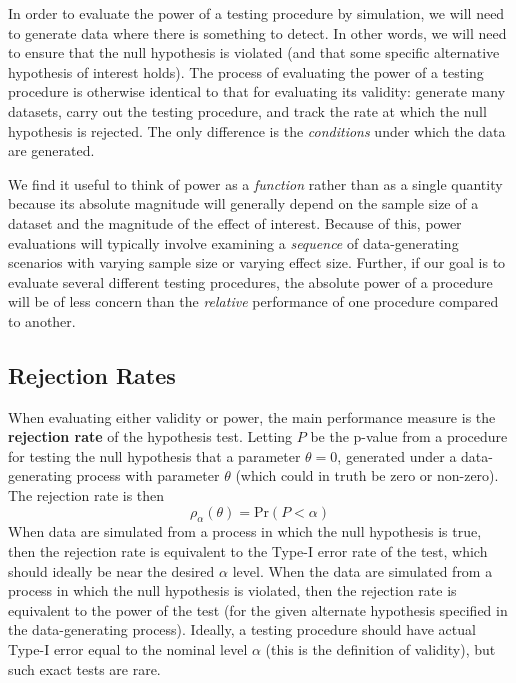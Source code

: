 \documentclass[
]{book}
\newcommand{\Prob}{\text{Pr}}
\begin{document}
In order to evaluate the power of a testing procedure by simulation, we will need to generate data where there is something to detect.
In other words, we will need to ensure that the null hypothesis is violated (and that some specific alternative hypothesis of interest holds).
The process of evaluating the power of a testing procedure is otherwise identical to that for evaluating its validity: generate many datasets, carry out the testing procedure, and track the rate at which the null hypothesis is rejected.
The only difference is the \emph{conditions} under which the data are generated.

We find it useful to think of power as a \emph{function} rather than as a single quantity because its absolute magnitude will generally depend on the sample size of a dataset and the magnitude of the effect of interest.
Because of this, power evaluations will typically involve examining a \emph{sequence} of data-generating scenarios with varying sample size or varying effect size.
Further, if our goal is to evaluate several different testing procedures, the absolute power of a procedure will be of less concern than the \emph{relative} performance of one procedure compared to another.

\subsection{Rejection Rates}\label{rejection-rates}

When evaluating either validity or power, the main performance measure is the \textbf{rejection rate} of the hypothesis test. Letting \(P\) be the p-value from a procedure for testing the null hypothesis that a parameter \(\theta = 0\), generated under a data-generating process with parameter \(\theta\) (which could in truth be zero or non-zero). The rejection rate is then
\[
\rho_\alpha(\theta) = \Prob(P < \alpha)
\label{eq:rejection-rate}
\]
When data are simulated from a process in which the null hypothesis is true, then the rejection rate is equivalent to the Type-I error rate of the test, which should ideally be near the desired \(\alpha\) level.
When the data are simulated from a process in which the null hypothesis is violated, then the rejection rate is equivalent to the power of the test (for the given alternate hypothesis specified in the data-generating process).
Ideally, a testing procedure should have actual Type-I error equal to the nominal level \(\alpha\) (this is the definition of validity), but such exact tests are rare.
\end{document}
